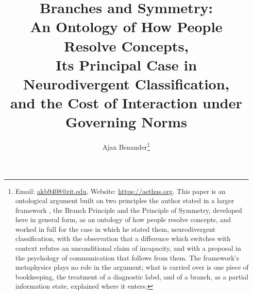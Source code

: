 \title{Branches and Symmetry:\\ An Ontology of How People Resolve Concepts,\\ Its Principal Case in Neurodivergent Classification,\\ and the Cost of Interaction under Governing Norms}
\author{Ajax Benander\thanks{Email: \href{mailto:akb9408@rit.edu}{akb9408@rit.edu}, Website: \url{https://aethus.org}. This paper is an ontological argument built on two principles the author stated in a larger framework \cite{Aethus}, the Branch Principle and the Principle of Symmetry, developed here in general form, as an ontology of how people resolve concepts, and worked in full for the case in which he stated them, neurodivergent classification, with the observation that a difference which switches with context refutes an unconditional claim of incapacity, and with a proposal in the psychology of communication that follows from them. The framework's metaphysics plays no role in the argument; what is carried over is one piece of bookkeeping, the treatment of a diagnostic label, and of a branch, as a partial information state, explained where it enters.}}
